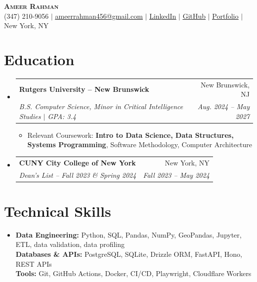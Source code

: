 \documentclass[letterpaper,10pt]{article}
\makeatletter
\newcommand{\resumeItem}[1]{\item\small{#1}}
\newcommand{\resumeSubheading}[4]{
  \vspace{1pt}\item
  \begin{tabular*}{0.97\textwidth}[t]{l@{\extracolsep{\fill}}r}
    \textbf{#1} & #2 \\
    \textit{\small #3} & \textit{\small #4} \\
  \end{tabular*}\vspace{-3pt}
}
\newcommand{\resumeSubHeadingListStart}{\begin{itemize}[leftmargin=0.15in,label={},itemsep=0pt,topsep=0pt]}
\newcommand{\resumeSubHeadingListEnd}{\end{itemize}}
\newcommand{\resumeItemListStart}{\begin{itemize}[leftmargin=0.15in,label=\textbullet,itemsep=-2pt,topsep=0pt]}
\newcommand{\resumeItemListEnd}{\end{itemize}\vspace{0pt}}
\makeatother
\begin{document}
\begin{center}
  {\Huge\scshape\textbf{Ameer Rahman}} \\ \vspace{2pt}
  \small (347) 210-9056 $|$
  \href{mailto:ameerrahman456@gmail.com}{\underline{ameerrahman456@gmail.com}} $|$
  \href{https://www.linkedin.com/in/ameer-rahman-a3bb232a0/}{\underline{LinkedIn}} $|$
  \href{https://github.com/ameer-rah}{\underline{GitHub}} $|$
  \href{https://ameer-rahman.info/}{\underline{Portfolio}} $|$ New York, NY
\end{center}

\section{Education}
\resumeSubHeadingListStart
  \resumeSubheading{Rutgers University -- New Brunswick}{New Brunswick, NJ}
    {B.S. Computer Science, Minor in Critical Intelligence Studies $|$ GPA: 3.4}{Aug. 2024 -- May 2027}
    \resumeItemListStart
      \resumeItem{Relevant Coursework: \textbf{Intro to Data Science, Data Structures, Systems Programming}, Software Methodology, Computer Architecture}
    \resumeItemListEnd
  \resumeSubheading{CUNY City College of New York}{New York, NY}
    {Dean's List -- Fall 2023 \& Spring 2024}{Fall 2023 -- May 2024}
\resumeSubHeadingListEnd

\section{Technical Skills}
\begin{itemize}[leftmargin=0.15in,label={},topsep=0pt]
  \small\item{
    \textbf{Data Engineering:} Python, SQL, Pandas, NumPy, GeoPandas, Jupyter, ETL, data validation, data profiling \\
    \textbf{Databases \& APIs:} PostgreSQL, SQLite, Drizzle ORM, FastAPI, Hono, REST APIs \\
    \textbf{Tools:} Git, GitHub Actions, Docker, CI/CD, Playwright, Cloudflare Workers
  }
\end{itemize}
\end{document}
